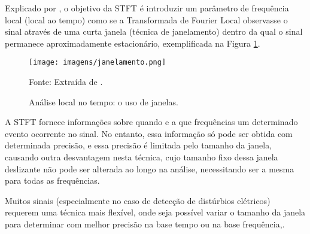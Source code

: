 Explicado por \cite{OLI07}, o objetivo da STFT é introduzir um parâmetro de frequência local (local ao tempo) como se a Transformada de Fourier Local observasse o sinal através de uma curta janela (técnica de janelamento) dentro da qual o sinal permanece aproximadamente estacionário, exemplificada na Figura \ref{fig:janelamento}.
\begin{figure}[!h]
\begin{center}
\caption{Análise local no tempo: o uso de janelas.}
\texttt{[image: imagens/janelamento.png]}
\par{\small Fonte: Extraída de \cite{OLI07}.}
\label{fig:janelamento}
\end{center}
\end{figure}
\par
A STFT fornece informações sobre quando e a que frequências um determinado evento ocorrente no sinal. No entanto, essa informação só pode ser obtida com determinada precisão, e essa precisão é limitada pelo tamanho da janela, causando outra desvantagem nesta técnica, cujo tamanho fixo dessa janela deslizante não pode ser alterada ao longo na análise, necessitando ser a mesma para todas as frequências. 
\par
Muitos sinais (especialmente no caso de detecção de distúrbios elétricos) requerem uma técnica mais flexível, onde seja possível variar o tamanho da janela para determinar com melhor precisão na base tempo ou na base frequência,\cite{MEN08}.
